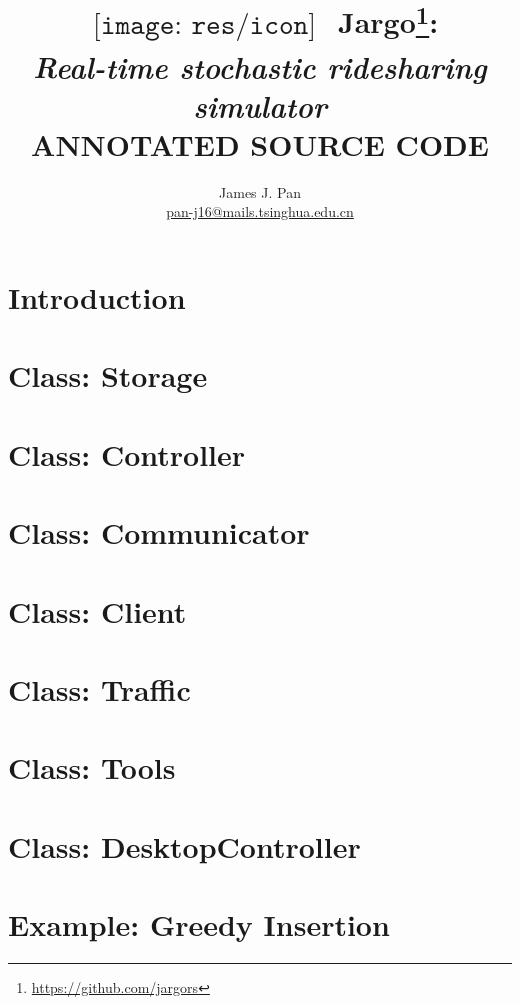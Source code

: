 \documentclass{report}
\title{
$
\begin{array}{l}
\texttt{[image: res/icon]}
\end{array}
$
Jargo\footnote{\url{https://github.com/jargors}}:\\
\large{\textbf{\textit{Real-time stochastic ridesharing simulator}}\\
\vspace{2em}
\small{\textsc{ANNOTATED SOURCE CODE}}}
}
\author{James J. Pan\\
  \small{\href{mailto:pan-j16@mails.tsinghua.edu.cn}{pan-j16@mails.tsinghua.edu.cn}}}
\theoremstyle{definition}                   %
\begin{document}
\maketitle
\pagestyle{noweb}

\renewcommand{\thepage}{\roman{page}}
\setcounter{page}{1}

\tableofcontents

\renewcommand{\thepage}{\arabic{page}}
\setcounter{page}{1}

\chapter{Introduction}
\label{ch:1}


\chapter{Class: Storage}
\label{ch:2}


\chapter{Class: Controller}
\label{ch:3}


\chapter{Class: Communicator}
\label{ch:4}


\chapter{Class: Client}
\label{ch:5}


\chapter{Class: Traffic}
\label{ch:6}


\chapter{Class: Tools}
\label{ch:7}


\chapter{Class: DesktopController}
\label{ch:8}


\chapter{Example: Greedy Insertion}
\label{ch:9}
\end{document}
